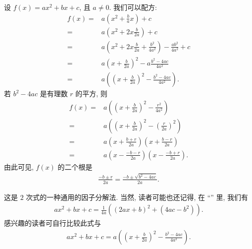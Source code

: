 \begin{example}
    设 $f(x) = ax^2 + bx + c$, 且 $a \neq 0$. 我们可以配方:
    \begin{align*}
        f(x)
        = {} & a \left( x^2 + \frac{b}{a} x \right) + c                                          \\
        = {} & a \left( x^2 + 2x \frac{b}{2a} \right) + c                                        \\
        = {} & a \left( x^2 + 2x \frac{b}{2a} + \frac{b^2}{4a^2} \right) - \frac{ab^2}{4a^2} + c \\
        = {} & a \left( x + \frac{b}{2a} \right)^2 - a \frac{b^2 - 4ac}{4a^2}                    \\
        = {} & a \left( \left( x + \frac{b}{2a} \right)^2 - \frac{b^2 - 4ac}{4a^2} \right).
    \end{align*}
    若 $b^2 - 4ac$ 是有理数 $r$ 的平方, 则
    \begin{align*}
        f(x)
        = {} & a \left( \left( x + \frac{b}{2a} \right)^2 - \frac{r^2}{4a^2} \right)              \\
        = {} & a \left( \left( x + \frac{b}{2a} \right)^2 - \left( \frac{r}{2a} \right)^2 \right) \\
        = {} & a \left( x + \frac{b + r}{2a} \right) \left( x + \frac{b - r}{2a} \right)          \\
        = {} & a \left( x - \frac{-b - r}{2a} \right) \left( x - \frac{-b + r}{2a} \right).
    \end{align*}
    由此可见, $f(x)$ 的二个根是
    \begin{align*}
        \frac{-b \pm r}{2a} = \frac{-b \pm \sqrt{b^2 - 4ac}}{2a}.
    \end{align*}

    这是 $2$ 次式的一种通用的因子分解法. 当然, 读者可能也还记得, 在 ``\FactorsOfHigherDegreeOfPolynomialsOverQ'' 里, 我们有
    \begin{align*}
        ax^2 + bx + c = \frac{1}{4a} ((2ax + b)^2 + (4ac - b^2)).
    \end{align*}
    感兴趣的读者可自行比较此式与
    \begin{align*}
        ax^2 + bx + c = a \left( \left( x + \frac{b}{2a} \right)^2 - \frac{b^2 - 4ac}{4a^2} \right).
    \end{align*}
\end{example}

